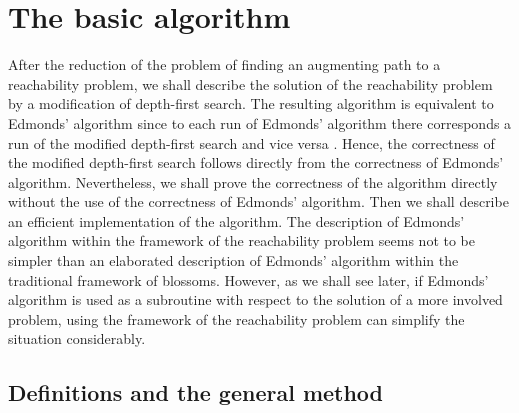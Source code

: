\documentclass[12pt,twoside,a4paper]{article}
\begin{document}
\section{The basic algorithm}

After the reduction of the problem of finding an augmenting path to a reachability
problem, we shall describe the solution of the reachability problem by a modification
of depth-first search. The resulting algorithm is equivalent to Edmonds' algorithm
since to each run of Edmonds' algorithm there corresponds a run of the modified
depth-first search and vice versa \cite{Ro}. Hence, the correctness of the modified
depth-first search follows directly from the correctness of Edmonds' algorithm.
Nevertheless, we shall prove the correctness of the algorithm directly without
the use of the correctness of Edmonds' algorithm. Then we shall describe an efficient
implementation of the algorithm. The description of Edmonds' algorithm within
the framework of the reachability problem seems not to be simpler than an
elaborated description of Edmonds' algorithm within the traditional framework
of blossoms. However, as we shall see later, if Edmonds' algorithm is used as a 
subroutine with respect to the solution of a more involved problem, using the framework
of the reachability problem can simplify the situation considerably.

\subsection{Definitions and the general method}
\end{document}
